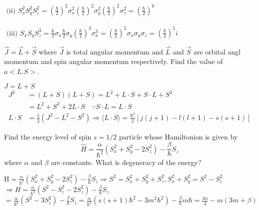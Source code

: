 \begin{enumerate}
\begin{answer}
	$\text { (ii) } S_{x}^{2} S_{y}^{2} S_{z}^{2}=\left(\frac{\hbar}{2}\right)^{2} \sigma_{x}^{2}\left(\frac{\hbar}{2}\right)^{2} \sigma_{y}^{2}\left(\frac{\hbar}{2}\right)^{2} \sigma_{z}^{2}=\left(\frac{\hbar}{2}\right)^{6}$\\\\
	$\text { (iii) } S_{x} S_{y} S_{z}^{3}=\frac{\hbar}{2} \sigma_{x} \frac{\hbar}{2} \sigma_{y}\left(\frac{\hbar}{2}\right)^{3} \sigma_{x}^{3}=\left(\frac{\hbar}{2}\right)^{5} \sigma_{x} \sigma_{y} \sigma_{z}=\left(\frac{\hbar}{2}\right)^{5} i$	
\end{answer}
	\begin{minipage}{\textwidth}
	\item $\vec{J}=\vec{L}+\vec{S}$ where $\vec{J}$ is total angular momentum and $\vec{L}$ and $\vec{S}$ are orbital angl momentum and spin angular momentum respectively. Find the value of $a<L . S>$.
\end{minipage}
\begin{answer}
	$J=L+S$
	$$
	\begin{aligned}
	J^{2} &=(L+S)(L+S)=L^{2}+L \cdot S+S \cdot L+S^{2} \\
	&=L^{2}+S^{2}+2 L \cdot S \quad \because S \cdot L=L \cdot S \\
	L \cdot S &=\frac{1}{2}\left(J^{2}-L^{2}-S^{2}\right) \Rightarrow\langle L \cdot S\rangle=\frac{\hbar^{2}}{2}\left[j(j+1)-l(l+1)-s(s+1)\right]
	\end{aligned}
	$$	
\end{answer}
	\begin{minipage}{\textwidth}
	\item Find the energy level of spin $s=1 / 2$ particle whose Hamiltonion is given by
	$$
	\hat{H}=\frac{\alpha}{\hbar^{2}}\left(S_{x}^{2}+S_{y}^{2}-2 S_{z}^{2}\right)-\frac{\beta}{\hbar} S_{z}
	$$
	where $\alpha$ and $\beta$ are constants. What is degeneracy of the energy?
\end{minipage}
\begin{answer}
	$\mathrm{H}=\frac{\alpha}{\hbar^{2}}\left(S_{x}^{2}+S_{y}^{2}-2 S_{z}^{2}\right)-\frac{\beta}{\hbar} S_{z} \Rightarrow S^{2}=S_{x}^{2}+S_{y}^{2}+S_{z}^{2}, S_{x}^{2}+S_{y}^{2}=S^{2}-S_{z}^{2}$ \\
	$\Rightarrow H=\frac{\alpha}{\hbar^{2}}\left(S^{2}-S_{z}^{2}-2 S_{z}^{2}\right)-\frac{\beta}{\hbar} S_{z}$\\
	$=\frac{\alpha}{\hbar^{2}}\left(S^{2}-3 S_{z}^{2}\right)-\frac{\beta}{\hbar} S_{z}=\frac{\alpha}{\hbar^{2}}\left(s(s+1) \hbar^{2}-3 m^{2} \hbar^{2}\right)-\frac{\beta}{\hbar} m \hbar=\frac{3 \alpha}{4}-m(3 m+\beta)$ \\

\end{answer}
\end{enumerate}
